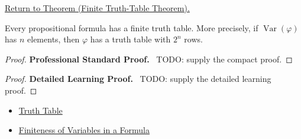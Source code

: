 \newpage
{}
\label{prf:finite-truth-table-propositional-logic}

\begin{remark*}[Return]
\hyperref[thm:finite-truth-table-propositional-logic]{Return to Theorem (Finite Truth-Table Theorem).}
\end{remark*}

\begin{theorem*}
Every propositional formula has a finite truth table. More precisely, if \(\operatorname{Var}(\varphi)\) has \(n\) elements, then \(\varphi\) has a truth table with \(2^n\) rows.
\end{theorem*}

\begin{proof}
\textbf{Professional Standard Proof.}~
TODO: supply the compact proof.
\end{proof}

\begin{proof}
\textbf{Detailed Learning Proof.}~
TODO: supply the detailed learning proof.
\end{proof}

\begin{remark*}
\end{remark*}

\begin{dependencies}
\begin{itemize}
  \item \hyperref[def:truth-table-propositional-logic]{Truth Table}
  \item \hyperref[lem:finiteness-of-variables-propositional-formulas]{Finiteness of Variables in a Formula}
\end{itemize}
\end{dependencies}

\clearpage
